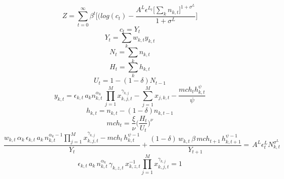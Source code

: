 \begin{dmath}
Z=\sum_{t = 0}^{\infty} \beta^{t} \Big[(log(c_{t}) - \frac{A^{L}\epsilon^{L_{t}}\Big[\sum_{k} n_{k,t}\Big]^{1 + \sigma^{L}}}{1 + \sigma^{L}} \Big]
\end{dmath}
\begin{dmath}
c_{t} = Y_{t}
\end{dmath}
\begin{dmath}
Y_{t}=  \sum_{k} w_{k,t} y_{k,t} 
\end{dmath}
\begin{dmath}
N_{t} = \sum_{k}  n_{k,t}
\end{dmath}
\begin{dmath}
H_{t} =  \sum_{k}  h_{k,t}
\end{dmath}
\begin{dmath}
U_{t} = 1-(1-\delta)N_{t-1}
\end{dmath}
\begin{dmath}
y_{k,t} = \epsilon_{k,t} \, a_{k} n_{k,t}^{\alpha_{k}} \, \prod_{j=1}^{M} x_{k,j,t}^{\gamma_{k,j}}-\sum_{j=1}^{M} x_{j,k,t} -\frac{mch_{t} h_{k,t}^{\psi}}{\psi} 
\end{dmath}
\begin{dmath}
h_{k,t}=n_{k,t}-(1-\delta)n_{k,t-1}
\end{dmath}
\begin{dmath}
mch_{t}=\frac{\xi}{\nu}\Big(\frac{H_{t}}{U_{t}}\Big)^{\nu}
\end{dmath}
\begin{dmath}
\frac{{w_{k,t}}\, {\alpha_{k}}\, \epsilon_{k,t} \, a_{k} \, n_{k,t}^{{\alpha_{k}}-1} \prod_{j=1}^{M} x_{k,j,t}^{\gamma_{k, j}} - mch_{t} \, h_{k,t}^{{\psi}-1}}{Y_{t}}+\frac{(1-{\delta})\, {w_{k,t}}\, {\beta}\, mch_{t+1}\, {h_{k,t+1}^{{\psi}-1}}}{Y_{t+1}}=\,A^{L}\epsilon^{L}_{t}N_{k,t}^{\sigma^{L}}
\end{dmath}
\begin{dmath}
\epsilon_{k,t}\, {a_{k}}\, n_{k,t}^{\alpha_{k}}\,{\gamma_{k,z,t}}\,x_{k,z,t}^{-1}\prod_{j=1}^{M} x_{k,j,t}^{\gamma_{k,j}}=1
\end{dmath}
